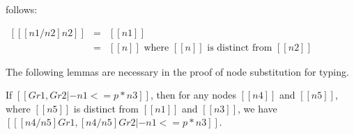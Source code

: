 follows: 
\begin{center}
  \begin{math}
    \begin{array}{lll}
      [[ [n1/n2] n2 ]] & = & [[n1]]\\
      [[ [n1/n2] n  ]] & = & [[n]] \text{ where } [[n]] \text{ is
        distinct from } [[n2]]
    \end{array}
  \end{math}
\end{center}
The following lemmas are necessary in the proof of node substitution
for typing.
\begin{lemma}
  \label{lemma:renaming_nodes_in_graph}
  If $[[Gr1, Gr2 |- n1 <=p* n3]]$, then for any nodes $[[n4]]$ and
  $[[n5]]$, where $[[n5]]$ is distinct from $[[n1]]$ and $[[n3]]$,
  we have $[[ [n4/n5]Gr1, [n4/n5]Gr2 |- n1 <=p* n3]]$.
\end{lemma}
